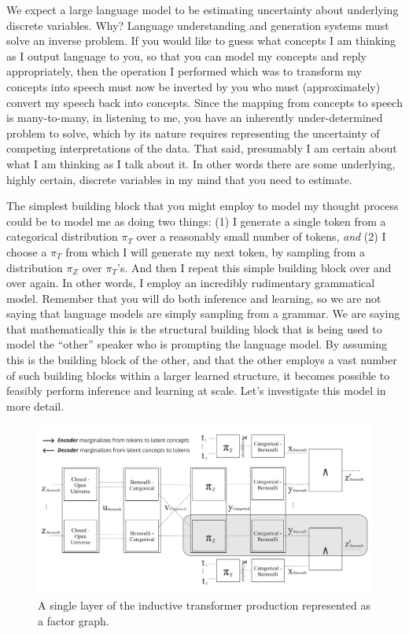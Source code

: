 \documentclass{article}
\begin{document}
We expect a large language model to be estimating uncertainty about underlying discrete variables.  Why? Language understanding and generation systems must solve an inverse problem.  If you would like to guess what concepts I am thinking as I output language to you, so that you can model my concepts and reply appropriately, then the operation I performed which was to transform my concepts into speech must now be inverted by you who must (approximately) convert my speech back into concepts.  Since the mapping from concepts to speech is many-to-many, in listening to me, you have an inherently under-determined problem to solve, which by its nature requires representing the uncertainty of competing interpretations of the data.  That said, presumably I am certain about what I am thinking as I talk about it. In other words there are some underlying, highly certain, discrete variables in my mind that you need to estimate.  

The simplest building block that you might employ to model my thought process could be to model me as doing two things: (1) I generate a single token from a categorical distribution $\pi_T$ over a reasonably small number of tokens, \emph{and} (2) I choose a $\pi_T$ from which I will generate my next token, by sampling from a distribution $\pi_Z$ over $\pi_T$'s.  And then I repeat this simple building block over and over again.  In other words, I employ an incredibly rudimentary grammatical model.  Remember that you will do both inference and learning, so we are not saying that language models are simply sampling from a grammar.  We are saying that mathematically this is the structural building block that is being used to model the ``other'' speaker who is prompting the language model. By assuming this is the building block of the other, and that the other employs a vast number of such building blocks within a larger learned structure, it becomes possible to feasibly perform inference and learning at scale.   Let's investigate this model in more detail.

\begin{figure}[H]
    \includegraphics[width=\textwidth]{figures/transformer_factor_graph.pdf}
    \caption{A single layer of the inductive transformer production represented as a factor graph.}
    \label{fig:factor-graph-for-inductive-transformer}
\end{figure}
\end{document}
